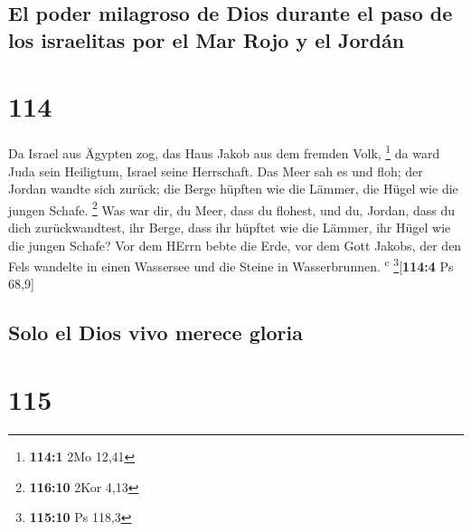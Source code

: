 \hypertarget{el-poder-milagroso-de-dios-durante-el-paso-de-los-israelitas-por-el-mar-rojo-y-el-jorduxe1n}{%
\subsection{El poder milagroso de Dios durante el paso de los israelitas
por el Mar Rojo y el
Jordán}\label{el-poder-milagroso-de-dios-durante-el-paso-de-los-israelitas-por-el-mar-rojo-y-el-jorduxe1n}}

\hypertarget{section-113}{%
\section{114}\label{section-113}}

 Da Israel aus Ägypten zog, das Haus Jakob aus dem fremden
Volk, \footnote{\textbf{114:1} 2Mo 12,41}  da ward Juda
sein Heiligtum, Israel seine Herrschaft.  Das Meer sah es
und floh; der Jordan wandte sich zurück;  die Berge
hüpften wie die Lämmer, die Hügel wie die jungen Schafe. \footnote{\textbf{116:10}
  2Kor 4,13}  Was war dir, du Meer, dass du flohest, und
du, Jordan, dass du dich zurückwandtest,  ihr Berge, dass
ihr hüpftet wie die Lämmer, ihr Hügel wie die jungen Schafe?
 Vor dem HErrn bebte die Erde, vor dem Gott Jakobs,
 der den Fels wandelte in einen Wassersee und die Steine
in Wasserbrunnen. \textsuperscript{c} \footnote{\textbf{115:10} Ps 118,3}{[}\textbf{114:4}
Ps 68,9{]}

\hypertarget{solo-el-dios-vivo-merece-gloria}{%
\subsection{Solo el Dios vivo merece
gloria}\label{solo-el-dios-vivo-merece-gloria}}

\hypertarget{section-114}{%
\section{115}\label{section-114}}

